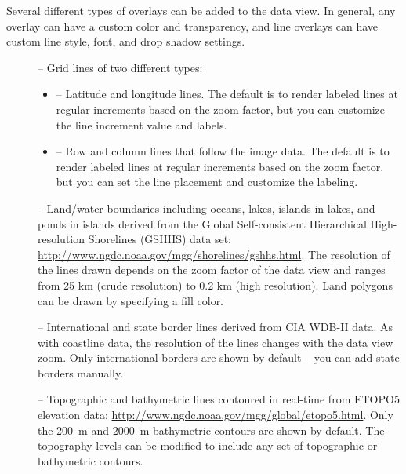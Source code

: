 Several different types of overlays can be added to the data
view.  In general, any overlay can have a custom color and
transparency, and line overlays can have custom line style, font,
and drop shadow settings.
\begin{description}

\item[] -- Grid lines of two different types:
\begin{itemize}

  \item {} -- Latitude and longitude
  lines.  The default is to render labeled lines at regular
  increments based on the zoom factor, but you can customize the
  line increment value and labels.

  \item {} -- Row and column
  lines that follow the image data.  The default is to render
  labeled lines at regular increments based on the zoom factor,
  but you can set the line placement and customize the labeling.

\end{itemize}

\item[] -- Land/water boundaries including
oceans, lakes, islands in lakes, and ponds in islands derived
from the Global Self-consistent Hierarchical High-resolution
Shorelines (GSHHS) data set:
\url{http://www.ngdc.noaa.gov/mgg/shorelines/gshhs.html}.  The
resolution of the lines drawn depends on the zoom factor of the
data view and ranges from 25 km (crude resolution) to 0.2 km
(high resolution).  Land polygons can be drawn by specifying a
fill color.

\item[] -- International and state
border lines derived from CIA WDB-II data.  As with coastline
data, the resolution of the lines changes with the data view
zoom.  Only international borders are shown by default -- you can
add state borders manually.

\item[] -- Topographic and
bathymetric lines contoured in real-time from ETOPO5 elevation
data: \url{http://www.ngdc.noaa.gov/mgg/global/etopo5.html}.
Only the 200~m and 2000~m bathymetric contours are shown by
default.  The topography levels can be modified to include any
set of topographic or bathymetric contours.


\end{description}
